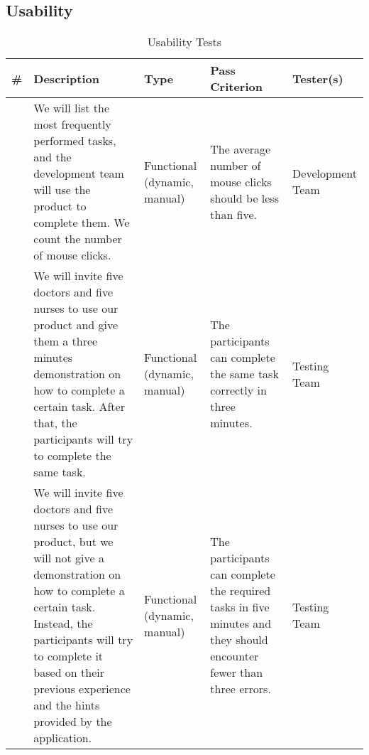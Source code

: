 \documentclass[12pt]{article}
\newcounter{TestCounter}
\begin{document}
\subsection{Usability}
\begin{center}
	\begin{longtable}{c>{\raggedright\arraybackslash}p{4.8cm} >{\raggedright\arraybackslash}p{3.5cm}>{\raggedright\arraybackslash}p{3cm}>{\raggedright\arraybackslash}p{3cm}}
		\caption{Usability Tests}\label{Usability Tests}\\
		\toprule
		\bf \# & \bf Description & \bf Type & \bf Pass Criterion & Tester(s) \\\midrule
		\stepcounter{TestCounter}\arabic{TestCounter} 
		& We will list the most frequently performed tasks, and the development
		team will use the product to complete them. We count the number of
		mouse clicks.
		& Functional (dynamic, manual)	
		& The average number of mouse clicks should be less than five.    
		& 	Development Team
		\\\midrule
		\stepcounter{TestCounter}\arabic{TestCounter} 
		& We will invite five doctors and five nurses to use our product and
		give them a three minutes demonstration on how to complete a certain
		task. After that, the participants will try to complete the same task.
		& Functional (dynamic, manual)	
		& The participants can complete the same task correctly in three minutes.  
		& 	Testing Team
		\\\midrule
		\stepcounter{TestCounter}\arabic{TestCounter} 
		& We will invite five doctors and five nurses to use our product, but
		we will not give a demonstration on how to complete a certain task.
		Instead, the participants will try to complete it based
		on their previous experience and the hints provided by the application.
		& Functional (dynamic, manual)	
		& The participants can complete the required tasks in five minutes and
		they should encounter fewer than three errors.  
		& 	Testing Team
		\\\midrule
		\bottomrule
	\end{longtable}
\end{center}
\end{document}

